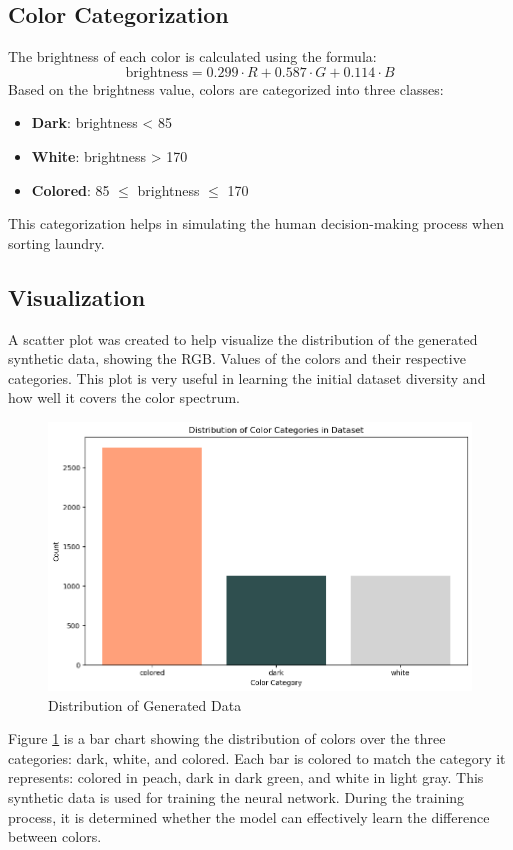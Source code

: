 \documentclass{article}
\begin{document}
\subsection{Color Categorization}
The brightness of each color is calculated using the formula:
\[ \text{brightness} = 0.299 \cdot R + 0.587 \cdot G + 0.114 \cdot B \]
Based on the brightness value, colors are categorized into three classes:
\begin{itemize}
    \item \textbf{Dark}: brightness < 85
    \item \textbf{White}: brightness > 170
    \item \textbf{Colored}: 85 $\leq$ brightness $\leq$ 170
\end{itemize}
This categorization helps in simulating the human decision-making process when sorting laundry.

\newpage

\subsection{Visualization}
A scatter plot was created to help visualize the distribution of the generated synthetic data, showing the RGB. Values of the colors and their respective categories. This plot is very useful in learning the initial dataset diversity and how well it covers the color spectrum.
\begin{figure}[H]
    \centering
    \includegraphics[width=\textwidth]{pictures/dis_out.png}
    \caption{Distribution of Generated Data}
    \label{fig:dis_out}
\end{figure}

Figure \ref{fig:dis_out} is a bar chart showing the distribution of colors over the three categories: dark, white, and colored. Each bar is colored to match the category it represents: colored in peach, dark in dark green, and white in light gray. This synthetic data is used for training the neural network. During the training process, it is determined whether the model can effectively learn the difference between colors.
\end{document}
